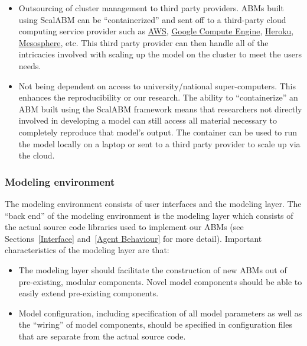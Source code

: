 \documentclass[a4paper]{article}
\begin{document}
\begin{itemize}
    \item Outsourcing of cluster management to third party providers. ABMs built using ScalABM can be ``containerized'' and sent off to a third-party cloud computing service provider such as \href{http://aws.amazon.com/}{AWS}, \href{https://cloud.google.com/compute/}{Google Compute Engine}, \href{https://www.heroku.com/}{Heroku}, \href{https://mesosphere.com/}{Mesosphere}, etc. This third party provider can then handle all of the intricacies involved with scaling up the model on the cluster to meet the users needs.
    \item Not being dependent on access to university/national super-computers. This enhances the reproducibility or our research.  The ability to ``containerize'' an ABM built using the ScalABM framework means that researchers not directly involved in developing a model can still access all material necessary to completely reproduce that model's output. The container can be used to run the model locally on a laptop or sent to a third party provider to scale up via the cloud. 
\end{itemize}

\subsubsection{Modeling environment}
The modeling environment consists of user interfaces and the modeling layer. The ``back end'' of the modeling environment is the modeling layer which consists of the actual source code libraries used to implement our ABMs (see Sections~\ref{Interface} and~\ref{Agent Behaviour} for more detail). Important characteristics of the modeling layer are that:  

\begin{itemize}
    \item The modeling layer should facilitate the construction of new ABMs out of pre-existing, modular components. Novel model components should be able to easily extend pre-existing components. 
    \item Model configuration, including specification of all model parameters as well as the ``wiring'' of model components, should be specified in configuration files that are separate from the actual source code.
\end{itemize}
\end{document}
